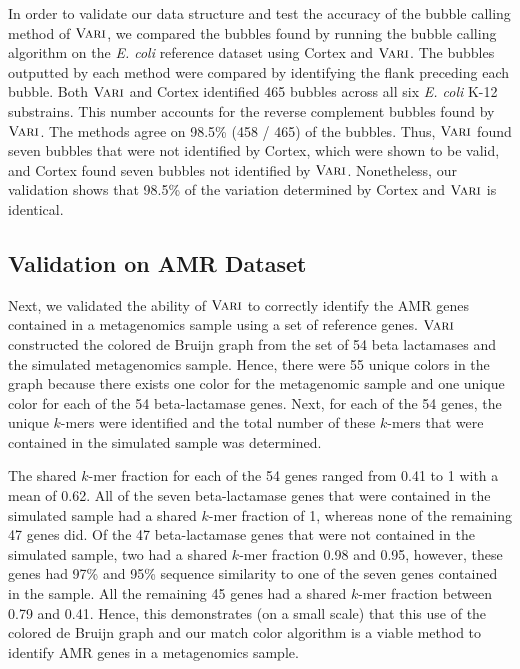 In order to validate our data structure and test the accuracy of the bubble calling method of $\mbox{\rm {\sc Vari}}$, we compared the bubbles found by running the bubble calling algorithm on the \emph{E. coli} reference dataset using {\sc Cortex} and $\mbox{\rm {\sc Vari}}$.  The bubbles outputted by each method were compared by identifying the flank preceding each bubble.  Both $\mbox{\rm {\sc Vari}}$ and {\sc Cortex} identified 465 bubbles across all six \emph{E. coli} K-12 substrains.  This number accounts for the reverse complement bubbles found by $\mbox{\rm {\sc Vari}}$. The methods agree on 98.5\% (458 / 465) of the bubbles. Thus, $\mbox{\rm {\sc Vari}}$ found seven bubbles that were not identified by {\sc Cortex}, which were shown to be valid, and {\sc Cortex} found seven bubbles not identified by $\mbox{\rm {\sc Vari}}$.
Nonetheless, our validation shows that 98.5\% of the variation determined by {\sc Cortex} and $\mbox{\rm {\sc Vari}}$ is identical.

\subsection{Validation on AMR Dataset}

Next, we validated the ability of $\mbox{\rm {\sc Vari}}$ to correctly identify the AMR genes contained in a metagenomics sample using a set of reference genes. $\mbox{\rm {\sc Vari}}$ constructed the colored de Bruijn graph from the set of 54 beta lactamases and the simulated metagenomics sample. Hence, there were 55 unique colors in the graph because there exists one color for the metagenomic sample and one unique color for each of the 54 beta-lactamase genes.  Next, for each of the 54 genes, the unique $k$-mers were identified and the total number of these $k$-mers that were contained in the simulated sample was determined.  

The shared $k$-mer fraction for each of the 54 genes ranged from 0.41 to 1 with a mean of 0.62.  All of the seven beta-lactamase genes that were contained in the simulated sample had a shared $k$-mer fraction of 1, whereas none of the remaining 47 genes did.  Of the 47 beta-lactamase genes that were not contained in the simulated sample, two had a shared $k$-mer fraction 0.98 and 0.95, however, these genes had 97\% and 95\% sequence similarity to one of the seven genes contained in the sample.  All the remaining 45 genes had a shared $k$-mer fraction between 0.79 and 0.41.  Hence, this demonstrates (on a small scale) that this use of the colored de Bruijn graph and our match color algorithm is a viable method to identify AMR genes in a metagenomics sample. 

